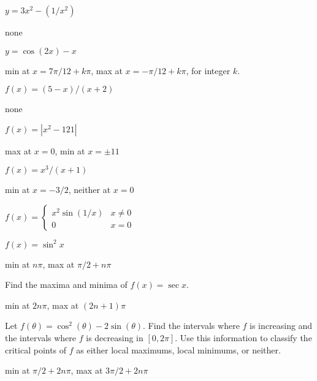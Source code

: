 \begin{exercises}
\begin{exercise} $y=3x^2-(1/x^2)$ 
\begin{answer} none
\end{answer}\end{exercise}

\begin{exercise} $y=\cos(2x)-x$ 
\begin{answer} min at $x=7\pi/12+k\pi$, max at $x=-\pi/12+k\pi$, for integer $k$.
\end{answer}\end{exercise}

\begin{exercise}
$f(x) = (5-x)/(x+2)$
\begin{answer} none
\end{answer}\end{exercise}

\begin{exercise} $f(x) = |x^2 - 121|$
\begin{answer} max at $x=0$, min at $x=\pm 11$
\end{answer}\end{exercise}

\begin{exercise} $f(x) = x^3/(x+1)$
\begin{answer} min at $x=-3/2$, neither at $x=0$
\end{answer}\end{exercise}

\begin{exercise} $f(x)= \begin{cases}
x^2 \sin(1/x)  & x\neq 0  \\
 0  & x=0 \end{cases}$
\end{exercise}

\begin{exercise} $f(x) = \sin ^2 x$
\begin{answer} min at $n\pi$, max at $\pi/2+n\pi$
\end{answer}\end{exercise}

\endtwocol
\bsk
\begin{exercise} Find the maxima and minima of $f(x)=\sec x$.
\begin{answer} min at $2n\pi$, max at $(2n+1)\pi$
\end{answer}\end{exercise}

\begin{exercise}  Let $f(\theta) = \cos^2(\theta) -
 2\sin(\theta)$.  Find the intervals where $f$ is increasing and the
 intervals where $f$ is decreasing in $[0,2\pi]$.  Use this
 information to classify the critical points of $f$ as either local
 maximums, local minimums, or neither.
\begin{answer} min at $\pi/2+2n\pi$, max at $3\pi/2+2n\pi$
\end{answer}\end{exercise}


\end{exercises}
